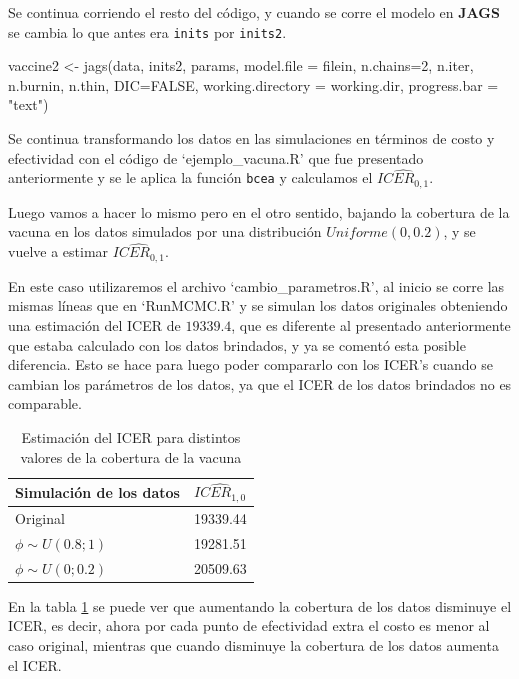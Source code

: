 \documentclass[12pt]{article}
\begin{document}
Se continua corriendo el resto del código, y cuando se corre el modelo en \textbf{JAGS} se cambia lo que antes era \texttt{inits} por \texttt{inits2}.

\begin{Rcode}
vaccine2 <- jags(data, inits2, params, model.file = filein, n.chains=2, n.iter, n.burnin, n.thin, DIC=FALSE, working.directory = working.dir, progress.bar = "text")
\end{Rcode}

Se continua transformando los datos en las simulaciones en términos de costo y efectividad con el código de `ejemplo\_vacuna.R' que fue presentado anteriormente y se le aplica la función \texttt{bcea} y calculamos el $\widehat{ICER_{0,1}}$.\

Luego vamos a hacer lo mismo pero en el otro sentido, bajando la cobertura de la vacuna en los datos simulados por una distribución $Uniforme(0,0.2)$, y se vuelve a estimar $\widehat{ICER_{0,1}}$.

En este caso utilizaremos el archivo `cambio\_parametros.R', al inicio se corre las mismas líneas que en `RunMCMC.R' y se simulan los datos originales obteniendo una estimación del ICER de $19339.4$, que es diferente al presentado anteriormente que estaba calculado con los datos brindados, y ya se comentó esta posible diferencia. Esto se hace para luego poder compararlo con los ICER's cuando se cambian los parámetros de los datos, ya que el ICER de los datos brindados no es comparable. 


\begin{table}[ht]
\centering
\begin{tabular}{ll}
  \hline
Simulación de los datos & $\widehat{ICER_{1,0}}$ \\ 
  \hline
Original & 19339.44 \\ 
$\phi \sim U(0.8 ; 1)$ & 19281.51 \\ 
$\phi \sim U(0 ;0.2)$ & 20509.63 \\ 
   \hline
\end{tabular}
\caption{Estimación del ICER para distintos valores de la cobertura de la vacuna}
\label{tabla:cambio_cobertura}
\end{table}


En la tabla \ref{tabla:cambio_cobertura} se puede ver que aumentando la cobertura de los datos disminuye el ICER, es decir, ahora por cada punto de efectividad extra el costo es menor al caso original, mientras que cuando disminuye la cobertura de los datos aumenta el ICER.
\end{document}
